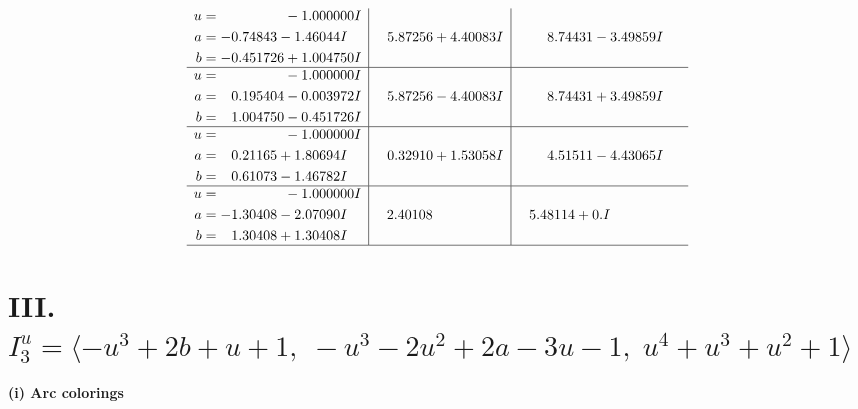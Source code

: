 \documentclass[1p]{elsarticle_modified}
\theoremstyle{definition}
\begin{document}
$$\begin{array}{c|c|c}
\begin{aligned}
u &= \phantom{-0.000000 } -1.000000 I \\
a &= -0.74843 - 1.46044 I \\
b &= -0.451726 + 1.004750 I\end{aligned}
 & \phantom{-}5.87256 + 4.40083 I & \phantom{-}8.74431 - 3.49859 I \\ \hline\begin{aligned}
u &= \phantom{-0.000000 } -1.000000 I \\
a &= \phantom{-}0.195404 - 0.003972 I \\
b &= \phantom{-}1.004750 - 0.451726 I\end{aligned}
 & \phantom{-}5.87256 - 4.40083 I & \phantom{-}8.74431 + 3.49859 I \\ \hline\begin{aligned}
u &= \phantom{-0.000000 } -1.000000 I \\
a &= \phantom{-}0.21165 + 1.80694 I \\
b &= \phantom{-}0.61073 - 1.46782 I\end{aligned}
 & \phantom{-}0.32910 + 1.53058 I & \phantom{-}4.51511 - 4.43065 I \\ \hline\begin{aligned}
u &= \phantom{-0.000000 } -1.000000 I \\
a &= -1.30408 - 2.07090 I \\
b &= \phantom{-}1.30408 + 1.30408 I\end{aligned}
 & \phantom{-}2.40108\phantom{ +0.000000I} & \phantom{-}5.48114 + 0. I\phantom{ +0.000000I}\\
 \hline 
 \end{array}$$\newpage\newpage\renewcommand{\arraystretch}{1}
\centering \section*{III. $I^u_{3}= \langle - u^3+2 b+u+1,\;- u^3-2 u^2+2 a-3 u-1,\;u^4+u^3+u^2+1 \rangle$}
\flushleft \textbf{(i) Arc colorings}\\
\end{document}
